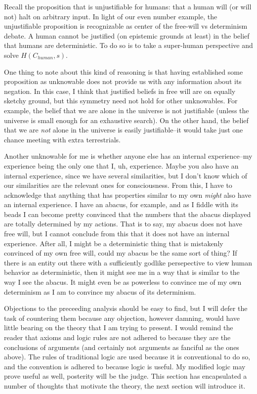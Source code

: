 \documentclass[12pt]{article}
\begin{document}
\begin{flushleft}
Recall the proposition that is unjustifiable for humans: that a human will (or will not) halt on arbitrary input.
In light of our even number example, the unjustifiable proposition is recognizable as center of the free-will vs determinism debate.
A human cannot be justified (on epistemic grounds at least) in the belief that humans are deterministic.
To do so is to take a super-human perspective and solve $H(C_{human}, s)$\footnotemark.

One thing to note about this kind of reasoning is that having established some proposition as unknowable does not provide us with any information about its negation.
In this case, I think that justified beliefs in free will are on equally sketchy ground\footnotemark, but this symmetry need not hold for other unknowables.
For example, the belief that we are alone in the universe is not justifiable (unless the universe is small enough for an exhaustive search).
On the other hand, the belief that we are \textit{not} alone in the universe is easily justifiable--it would take just one chance meeting with extra terrestrials.

Another unknowable for me is whether anyone else has an internal experience--my experience being the only one that I, uh, experience\footnotemark.
Maybe you also have an internal experience, since we have several similarities, but I don't know which of our similarities are the relevant ones for consciousness.
From this, I have to acknowledge that anything that has properties similar to my own \textit{might} also have an internal experience.
I have an abacus, for example, and as I fiddle with its beads I can become pretty convinced that the numbers that the abacus displayed are totally determined by my actions.
That is to say, my abacus does not have free will, but I cannot conclude from this that it does not have an internal experience.
After all, I might be a deterministic thing that is mistakenly convinced of my own free will, could my abacus be the same sort of thing?
If there is an entity out there with a sufficiently godlike persepective to view human behavior as deterministic, then it might see me in a way that is similar to the way I see the abacus.
It might even be as powerless to convince me of my own determinism as I am to convince my abacus of its determinism.

Objections to the preceeding analysis should be easy to find, but I will defer the task of countering them because any objection, however damning, would have little bearing on the theory that I am trying to present.
I would remind the reader that axioms and logic rules are not adhered to because they are the conclusions of arguments (and certainly not arguments as fanciful as the ones above).
The rules of traditional logic are used because it is conventional to do so, and the convention is adhered to because logic is useful.
My modified logic may prove useful as well, posterity will be the judge.
This section has encapsulated a number of thoughts that motivate the theory, the next section will introduce it.


\end{flushleft}
\end{document}
